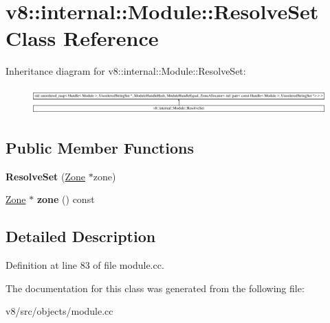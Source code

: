 \hypertarget{classv8_1_1internal_1_1Module_1_1ResolveSet}{}\section{v8\+:\+:internal\+:\+:Module\+:\+:Resolve\+Set Class Reference}
\label{classv8_1_1internal_1_1Module_1_1ResolveSet}
Inheritance diagram for v8\+:\+:internal\+:\+:Module\+:\+:Resolve\+Set\+:\begin{figure}[H]
\begin{center}
\leavevmode
\includegraphics[height=1.032258cm]{classv8_1_1internal_1_1Module_1_1ResolveSet}
\end{center}
\end{figure}
\subsection*{Public Member Functions}
\begin{DoxyCompactItemize}
\item 
\mbox{\label{classv8_1_1internal_1_1Module_1_1ResolveSet_a9dc436df949a595cbce24d9df53e5a8b}} 
{\bfseries Resolve\+Set} (\mbox{\hyperlink{classv8_1_1internal_1_1Zone}{Zone}} $\ast$zone)
\item 
\mbox{\label{classv8_1_1internal_1_1Module_1_1ResolveSet_aa6e8fa9caf8bd494247b796bd41a6b9f}} 
\mbox{\hyperlink{classv8_1_1internal_1_1Zone}{Zone}} $\ast$ {\bfseries zone} () const
\end{DoxyCompactItemize}


\subsection{Detailed Description}


Definition at line 83 of file module.\+cc.



The documentation for this class was generated from the following file\+:\begin{DoxyCompactItemize}
\item 
v8/src/objects/module.\+cc\end{DoxyCompactItemize}
